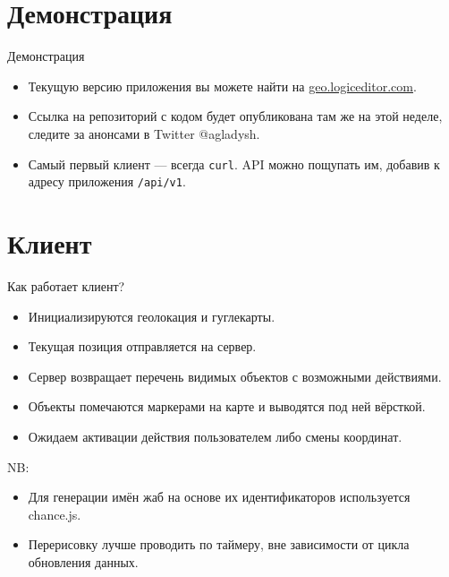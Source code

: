 \documentclass[aspectratio=169,handout,bigger]{beamer}
\begin{document}

\section{Демонстрация}


\begin{frame}{Демонстрация}
  \begin{itemize}
    \item Текущую версию приложения вы можете найти на
          \href{https://geo.logiceditor.com/}{geo.logiceditor.com}.
    \item Ссылка на репозиторий с кодом будет опубликована
          там же на этой неделе, следите за анонсами в Twitter @agladysh.
    \item Самый первый клиент --- всегда \texttt{curl}.
          API можно пощупать им, добавив к адресу приложения
          \texttt{/api/v1}.
  \end{itemize}
\end{frame}


\section{Клиент}


\begin{frame}{Как работает клиент?}
  \begin{itemize}
    \item Инициализируются геолокация и гуглекарты.
    \item Текущая позиция отправляется на сервер.
    \item Сервер возвращает перечень видимых объектов с возможными действиями.
    \item Объекты помечаются маркерами на карте и выводятся под ней вёрсткой.
    \item Ожидаем активации действия пользователем либо смены координат.
  \end{itemize}
  \vspace*{1em}\par
  NB:
  \begin{itemize}
    \item Для генерации имён жаб на основе их идентификаторов
          используется chance.js.
    \item Перерисовку лучше проводить по таймеру,
          вне зависимости от цикла обновления данных.
  \end{itemize}
\end{frame}
\end{document}
